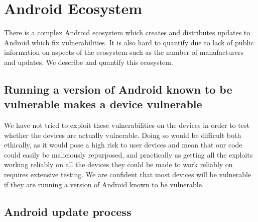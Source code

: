 \documentclass[conference,a4paper,twoside]{IEEEtran}
\let\OldTodo\todo
\renewcommand{\todo}{\OldTodo[inline]}
\begin{document}
\section{Android Ecosystem}
There is a complex Android ecosystem which creates and distributes updates to Android which fix vulnerabilities.
It is also hard to quantify due to lack of public information on aspects of the ecosystem such as the number of manufacturers and updates.
We describe and quantify this ecosystem.

\subsection{Running a version of Android known to be vulnerable makes a device vulnerable}
We have not tried to exploit these vulnerabilities on the devices in order to test whether the devices are actually vulnerable.
Doing so would be difficult both ethically, as it would pose a high risk to user devices and mean that our code could easily be maliciously repurposed, and practically as getting all the exploits working reliably on all the devices they could be made to work reliably on requires extensive testing.
We are confident that most devices will be vulnerable if they are running a version of Android known to be vulnerable. \todo{WHY?}


\subsection{Android update process}
\end{document}
